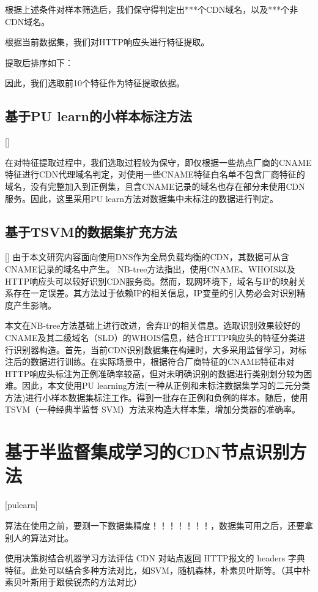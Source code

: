 根据上述条件对样本筛选后，我们保守得判定出***个CDN域名，以及***个非CDN域名。

根据当前数据集，我们对HTTP响应头进行特征提取。

提取后排序如下：

因此，我们选取前10个特征作为特征提取依据。

\subsection{基于PU learn的小样本标注方法}[]

在对特征提取过程中，我们选取过程较为保守，即仅根据一些热点厂商的CNAME特征进行CDN代理域名判定，对使用一些CNAME特征白名单不包含厂商特征的域名，没有完整加入到正例集，且含CNAME记录的域名也存在部分未使用CDN服务。因此，这里采用PU learn方法对数据集中未标注的数据进行判定。



\subsection{基于TSVM的数据集扩充方法}[]
由于本文研究内容面向使用DNS作为全局负载均衡的CDN，其数据可从含CNAME记录的域名中产生。
NB-tree方法\cite{Hou2021}指出，使用CNAME、WHOIS以及HTTP响应头可以较好识别CDN服务商。然而，现网环境下，域名与IP的映射关系存在一定误差\cite{Ma2021}。其方法过于依赖IP的相关信息，IP变量的引入势必会对识别精度产生影响。

本文在NB-tree方法\cite{Hou2021}基础上进行改进，舍弃IP的相关信息。选取识别效果较好的CNAME及其二级域名（SLD）的WHOIS信息，结合HTTP响应头的特征分类进行识别器构造。首先，当前CDN识别数据集在构建时，大多采用监督学习，对标注后的数据进行训练。在实际场景中，根据符合厂商特征的CNAME特征串对HTTP响应头标注为正例准确率较高，但对未明确识别的数据进行类别划分较为困难。因此，本文使用PU learning\cite{Bekker2020}方法(一种从正例和未标注数据集学习的二元分类方法)进行小样本数据集标注工作。得到一批存在正例和负例的样本。随后，使用TSVM\cite{Joachims1999}（一种经典半监督 SVM）方法来构造大样本集，增加分类器的准确率。


\section{基于半监督集成学习的CDN节点识别方法}[pulearn]




算法在使用之前，要测一下数据集精度！！！！！！！，数据集可用之后，还要拿别人的算法对比。


使用决策树结合机器学习方法评估 CDN 对站点返回 HTTP报文的 headers 字典特征。此处可以结合多种方法对比，如SVM，随机森林，朴素贝叶斯等。（其中朴素贝叶斯用于跟侯锐杰的方法对比）

